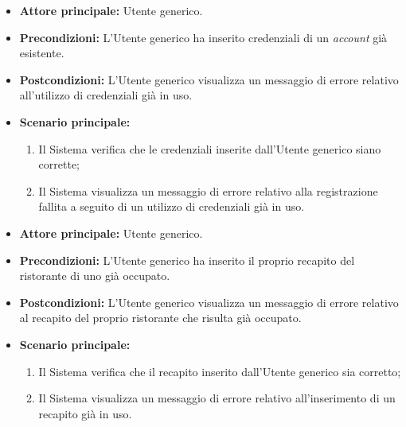 \label{usecase:Errore registrazione account esistente}
\begin{itemize}

	\item \textbf{Attore principale:} Utente generico.

	\item \textbf{Precondizioni:} L'Utente generico ha inserito credenziali di un \textit{account} già esistente.

	\item \textbf{Postcondizioni:} L'Utente generico visualizza un messaggio di errore relativo all'utilizzo di credenziali già in uso.

	\item \textbf{Scenario principale:}
	\begin{enumerate}
        \item Il Sistema verifica che le credenziali inserite dall'Utente generico siano corrette;
        \item Il Sistema visualizza un messaggio di errore relativo alla registrazione fallita a seguito di un utilizzo di credenziali già in uso.
	\end{enumerate}
	
\end{itemize}

\label{usecase:Errore registrazione recapito occupato}
\begin{itemize}

	\item \textbf{Attore principale:} Utente generico.

	\item \textbf{Precondizioni:} L'Utente generico ha inserito il proprio recapito del ristorante di uno già occupato.
	
	\item \textbf{Postcondizioni:} L'Utente generico visualizza un messaggio di errore relativo al recapito del proprio ristorante che risulta già occupato.

	\item \textbf{Scenario principale:}
	\begin{enumerate}
        \item Il Sistema verifica che il recapito inserito dall'Utente generico sia corretto;
        \item Il Sistema visualizza un messaggio di errore relativo all'inserimento di un recapito già in uso.
	\end{enumerate}
	
\end{itemize}